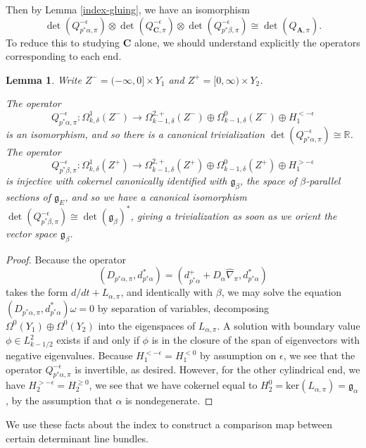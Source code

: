 \documentclass[10pt,a4paper]{amsart}
\newtheorem{lemma}[theorem]{Lemma}
\theoremstyle{definition}
\theoremstyle{remark}
\numberwithin{figure}{qchap}
\begin{document}
Then by Lemma \ref{index-gluing}, we have an isomorphism $$\det(Q_{p^*\alpha,\pi}^{-\epsilon}) \otimes \det(Q_{\mathbf{C},\pi}^{-\epsilon}) \otimes \det(Q_{p^*\beta,\pi}^{-\epsilon}) \cong \det(Q_{\mathbf{A},\pi}).$$ To reduce this to studying $\mathbf{C}$ alone, we should understand explicitly the operators corresponding to each end.

\begin{lemma}Write $Z^- = (-\infty, 0] \times Y_1$ and $Z^+ = [0, \infty) \times Y_2$.

The operator $$Q_{p^*\alpha, \pi}^{-\epsilon}: \Omega^1_{k,\delta}(Z^-) \to \Omega^{2,+}_{k-1,\delta}(Z^-) \oplus \Omega^0_{k-1,\delta}(Z^-) \oplus H_1^{< -\epsilon}$$ is an isomorphism, and so there is a canonical trivialization $\det(Q_{p^*\alpha, \pi}^{-\epsilon}) \cong \mathbb R$. The operator $$Q_{p^*\beta, \pi}^{-\epsilon}: \Omega^1_{k,\delta}(Z^+) \to \Omega^{2,+}_{k-1,\delta}(Z^+) \oplus \Omega^0_{k-1,\delta}(Z^+) \oplus H_1^{> -\epsilon}$$ is injective with cokernel canonically identified with $\mathfrak g_\beta$, the space of $\beta$-parallel sections of $\mathfrak g_E$, and so we have a canonical isomorphism $\det(Q_{p^*\beta, \pi}^{-\epsilon}) \cong \det(\mathfrak g_\beta)^*$, giving a trivialization as soon as we orient the vector space $\mathfrak g_\beta$.
\end{lemma}
\begin{proof}Because the operator $$(D_{p^*\alpha, \pi}, d^*_{p^*\alpha}) = (d^+_{p^*\alpha} + D_\alpha \widehat{\nabla}_\pi, d^*_{p^*\alpha})$$ takes the form $d/dt + L_{\alpha, \pi}$, and identically with $\beta$, we may solve the equation $(D_{p^*\alpha, \pi}, d^*_{p^*\alpha})\omega = 0$ by separation of variables, decomposing $\Omega^0(Y_1) \oplus \Omega^0(Y_2)$ into the eigenspaces of $L_{\alpha,\pi}$. A solution with boundary value $\phi \in L^2_{k-1/2}$ exists if and only if $\phi$ is in the closure of the span of eigenvectors with negative eigenvalues. Because $H_1^{< -\epsilon} = H_1^{< 0}$ by assumption on $\epsilon$, we see that the operator $Q_{p^*\alpha, \pi}^{-\epsilon}$ is invertible, as desired. However, for the other cylindrical end, we have $H_2^{> -\epsilon} = H_2^{\geq 0}$, we see that we have cokernel equal to $H_2^0 = \text{ker}(L_{\alpha,\pi}) = \mathfrak g_\alpha$, by the assumption that $\alpha$ is nondegenerate.
\end{proof}

We use these facts about the index to construct a comparison map between certain determinant line bundles.
\end{document}
